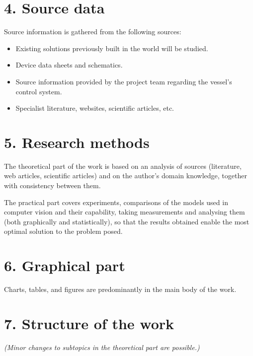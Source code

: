 \section*{4. Source data}

Source information is gathered from the following sources:

\begin{itemize}
  \item Existing solutions previously built in the world will be studied.
  \item Device data sheets and schematics.
  \item Source information provided by the project team regarding the vessel's control system.
  \item Specialist literature, websites, scientific articles, etc.
\end{itemize}

\section*{5. Research methods}

The theoretical part of the work is based on an analysis of sources (literature, web articles, scientific articles) and on the author's domain knowledge, together with consistency between them.

The practical part covers experiments, comparisons of the models used in computer vision and their capability, taking measurements and analysing them (both graphically and statistically), so that the results obtained enable the most optimal solution to the problem posed.

\section*{6. Graphical part}

Charts, tables, and figures are predominantly in the main body of the work.

\section*{7. Structure of the work}

\textit{(Minor changes to subtopics in the theoretical part are possible.)}

